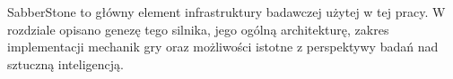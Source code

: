 \label{chapter:engine}

SabberStone to główny element infrastruktury badawczej użytej w tej pracy. W rozdziale opisano genezę tego silnika, jego ogólną architekturę, zakres implementacji mechanik gry oraz możliwości istotne z perspektywy badań nad sztuczną inteligencją.







